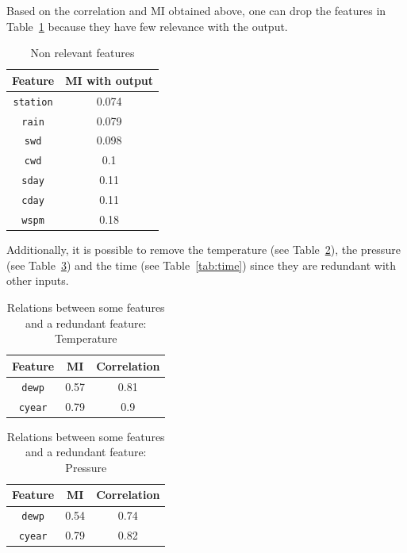 \documentclass[journal,11pt]{IEEEtran}
\begin{document}
Based on the correlation and MI obtained above, one can drop the features in Table~\ref{tab:relevance} because they have few relevance with the output.

\begin{table}[H]
\setlength{}
\centering
\begin{tabular}{cc}
\hline
Feature &  MI with output  \\ \hline
\texttt{station} &  0.074  \\
\texttt{rain}    &  0.079  \\
\texttt{swd}  &  0.098   \\
\texttt{cwd}  &  0.1   \\
\texttt{sday}  &  0.11   \\
\texttt{cday}  &  0.11   \\
\texttt{wspm}  &  0.18   \\ \hline
\end{tabular}
\vspace*{3mm}
\caption{Non relevant features}
\label{tab:relevance}
\end{table}

Additionally, it is possible to remove the temperature (see Table~\ref{tab:temp}), the pressure (see Table~\ref{tab:pres}) and the time (see Table~\ref{tab:time}) since they are redundant with other inputs.

\begin{table}[H]
\setlength{}
\centering
\begin{tabular}{ccc}
\hline
Feature &  MI & Correlation \\ \hline
 \texttt{dewp}  & 0.57  & 0.81  \\
 \texttt{cyear}  & 0.79  &  0.9 \\ \hline
\end{tabular}
\vspace*{3mm}
\caption{Relations between some features and a redundant feature: Temperature}
\label{tab:temp}
\end{table}

\begin{table}[H]
\setlength{}
\centering
\begin{tabular}{ccc}
\hline
Feature &  MI & Correlation \\ \hline
 \texttt{dewp}  & 0.54  & 0.74  \\
 \texttt{cyear}  & 0.79  &  0.82 \\ \hline
\end{tabular}
\vspace*{3mm}
\caption{Relations between some features and a redundant feature: Pressure}
\label{tab:pres}
\end{table}
\end{document}

